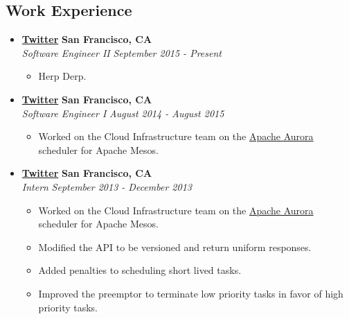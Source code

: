 \documentclass[10pt,letterpaper]{article}
\begin{document}
\subsection*{Work Experience}
  \begin{itemize}
    \parskip=-0.1em

    \item[]
    {\href{http://www.twitter.com}{\textbf{Twitter}} \hfill
      \textbf{San Francisco, CA}}
    \\
    {\emph{Software Engineer II} \hfill \emph{September 2015 - Present}}

    \begin{itemize}[label=\textbullet]
      \itemsep0em
      \item Herp Derp.
    \end{itemize}


    \item[]
    {\href{http://www.twitter.com}{\textbf{Twitter}} \hfill
      \textbf{San Francisco, CA}}
    \\
    {\emph{Software Engineer I} \hfill \emph{August 2014 - August 2015}}

    \begin{itemize}[label=\textbullet]
      \itemsep0em
      \item Worked on the Cloud Infrastructure team on the
        \href{aurora.incubator.apache.org}{Apache Aurora} scheduler for Apache Mesos.
    \end{itemize}

    \item[]
    {\href{http://www.twitter.com}{\textbf{Twitter}} \hfill
      \textbf{San Francisco, CA}}
    \\
    {\emph{Intern} \hfill \emph{September 2013 - December 2013}}

    \begin{itemize}[label=\textbullet]
      \itemsep0em
      \item Worked on the Cloud Infrastructure team on the
        \href{aurora.incubator.apache.org}{Apache Aurora} scheduler for Apache Mesos.
      \item Modified the API to be versioned and return uniform responses.
      \item Added penalties to scheduling short lived tasks.
      \item Improved the preemptor to terminate low priority tasks in favor of
        high priority tasks.
    \end{itemize}


\end{itemize}
\end{document}
